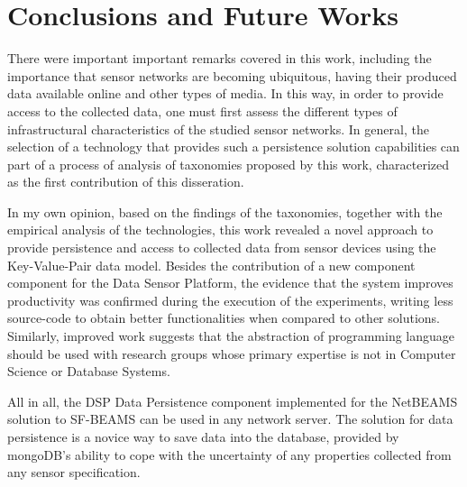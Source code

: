 

\chapter{Conclusions and Future Works}

There were important important remarks covered in this work, including the
importance that sensor networks are becoming ubiquitous, having their produced
data available online and other types of media. In this way, in order to
provide access to the collected data, one must first assess the different
types of infrastructural characteristics of the studied sensor networks. In
general, the selection of a technology that provides such a persistence
solution capabilities can  part of a process of analysis of taxonomies
proposed by this work, characterized as the first contribution of this
disseration.

In my own opinion, based on the findings of the taxonomies, together with
the empirical analysis of the technologies, this work revealed a novel approach
to provide persistence and access to collected data from sensor devices using
the Key-Value-Pair data model. Besides the contribution of a new component
component for the Data Sensor Platform, the evidence that the system improves
productivity was confirmed during the execution of the experiments, writing
less source-code to obtain better functionalities when compared to other
solutions. Similarly, improved work suggests that the abstraction of
programming language should be used with research groups whose primary
expertise is not in Computer Science or Database Systems.

All in all, the DSP Data Persistence component implemented for the NetBEAMS
solution to SF-BEAMS can be used in any network server. The solution for data
persistence is a novice way to save data into the database, provided by
mongoDB's ability to cope with the uncertainty of any properties collected from
any sensor specification.

